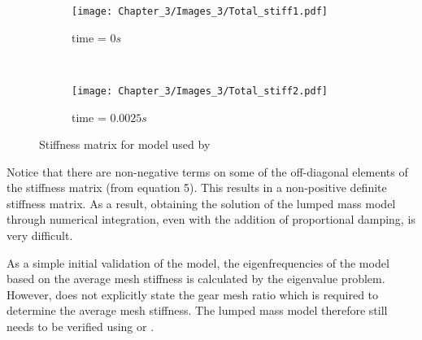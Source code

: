 \begin{figure}[H]
	\centering
	\begin{subfigure}{0.49\textwidth}
		\texttt{[image: Chapter\_3/Images\_3/Total\_stiff1.pdf]}
		\caption{time = $0s$ }
	\end{subfigure}
	~
	\begin{subfigure}{0.49\textwidth}
		\texttt{[image: Chapter\_3/Images\_3/Total\_stiff2.pdf]}
		\caption{time = $0.0025s$ }
	\end{subfigure}
	
	\caption{Stiffness matrix for model used by \cite{Chaari2006}}
	\label{F:Stiffness}
\end{figure}

Notice that there are non-negative terms on some of the off-diagonal elements of the stiffness matrix (from \cite{Chaari2006} equation 5). This results in a non-positive definite stiffness matrix. As a result, obtaining the solution of the lumped mass model through numerical integration, even with the addition of proportional damping, is very difficult.  

As a simple initial validation of the model, the eigenfrequencies of the model based on the average mesh stiffness is calculated by the eigenvalue problem. However, \cite{Chaari2006} does not explicitly state the gear mesh ratio which is required to determine the average mesh stiffness. The lumped mass model therefore still needs to be verified using \cite{Chaari2006} or \cite{Lin1999}.




